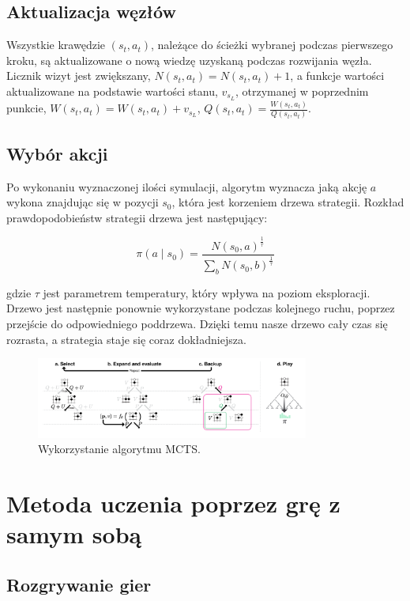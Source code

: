 \documentclass[licencjacka]{pracamgr}
\begin{document}
\subsection{Aktualizacja węzłów}

Wszystkie krawędzie $(s_t, a_t)$, należące do ścieżki wybranej podczas pierwszego kroku, są aktualizowane o nową wiedzę uzyskaną podczas rozwijania węzła. Licznik wizyt jest zwiększany, $N(s_t, a_t) = N(s_t, a_t) + 1$, a funkcje wartości aktualizowane na podstawie wartości stanu, $v_{s_L}$, otrzymanej w poprzednim punkcie, $W(s_t, a_t) = W(s_t, a_t) + v_{s_L}$, $Q(s_t, a_t) = \frac{W(s_t, a_t)}{Q(s_t, a_t)}$.

\subsection{Wybór akcji}

Po wykonaniu wyznaczonej ilości symulacji, algorytm wyznacza jaką akcję $a$ wykona znajdując się w pozycji $s_0$, która jest korzeniem drzewa strategii. Rozkład prawdopodobieństw strategii drzewa jest następujący:

$$
\pi(a \mid s_0) = \frac {N(s_0, a)^{\frac{1}{\tau}}}{\sum_b N(s_0, b)^{\frac{1}{\tau}}}
$$

gdzie $\tau$ jest parametrem temperatury, który wpływa na poziom eksploracji. Drzewo jest następnie ponownie wykorzystane podczas kolejnego ruchu, poprzez przejście do odpowiedniego poddrzewa. Dzięki temu nasze drzewo cały czas się rozrasta, a strategia staje się coraz dokładniejsza.

\begin{figure}[ht!]
  \centering
  \includegraphics[width=0.8\textwidth]{alphago-mcts}
  \caption{Wykorzystanie algorytmu MCTS. \cite{alphagozero}}
\end{figure}

\section{Metoda uczenia poprzez grę z samym sobą}

\subsection{Rozgrywanie gier}
\end{document}
